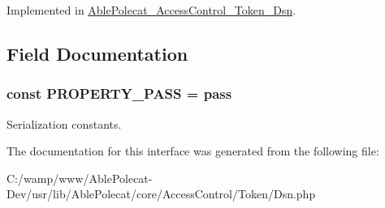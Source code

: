 Implemented in \hyperlink{class_able_polecat___access_control___token___dsn_a81b37a3c9d639574e394f80c1138c75e}{Able\+Polecat\+\_\+\+Access\+Control\+\_\+\+Token\+\_\+\+Dsn}.



\subsection{Field Documentation}
\hypertarget{interface_able_polecat___access_control___token___dsn_interface_a18bff7f0aa281c740adceccaeaeb3c89}{}
\subsubsection[{P\+R\+O\+P\+E\+R\+T\+Y\+\_\+\+P\+A\+S\+S}]{\setlength{\rightskip}{0pt plus 5cm}const P\+R\+O\+P\+E\+R\+T\+Y\+\_\+\+P\+A\+S\+S = \textquotesingle{}pass\textquotesingle{}}\label{interface_able_polecat___access_control___token___dsn_interface_a18bff7f0aa281c740adceccaeaeb3c89}
Serialization constants. 

The documentation for this interface was generated from the following file\+:\begin{DoxyCompactItemize}
\item 
C\+:/wamp/www/\+Able\+Polecat-\/\+Dev/usr/lib/\+Able\+Polecat/core/\+Access\+Control/\+Token/Dsn.\+php\end{DoxyCompactItemize}

